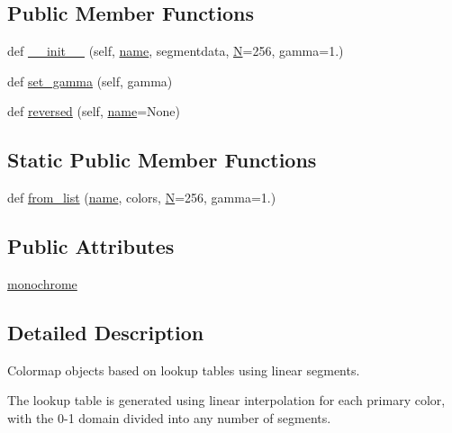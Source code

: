 \subsection*{Public Member Functions}
\begin{DoxyCompactItemize}
\item 
def \hyperlink{classmatplotlib_1_1colors_1_1LinearSegmentedColormap_ac4cce3cbb564402bb71c0dee4d78118a}{\+\_\+\+\_\+init\+\_\+\+\_\+} (self, \hyperlink{classmatplotlib_1_1colors_1_1Colormap_aa816ba9aebc8d8438ca791c82bb6198c}{name}, segmentdata, \hyperlink{classmatplotlib_1_1colors_1_1Colormap_a011f75e2d28856dd18ada18febb2bb26}{N}=256, gamma=1.)
\item 
def \hyperlink{classmatplotlib_1_1colors_1_1LinearSegmentedColormap_a2f198e251d17bf78aa2d64d067bc50eb}{set\+\_\+gamma} (self, gamma)
\item 
def \hyperlink{classmatplotlib_1_1colors_1_1LinearSegmentedColormap_a0bebcf7401f97a02809b57eaf7d30c66}{reversed} (self, \hyperlink{classmatplotlib_1_1colors_1_1Colormap_aa816ba9aebc8d8438ca791c82bb6198c}{name}=None)
\end{DoxyCompactItemize}
\subsection*{Static Public Member Functions}
\begin{DoxyCompactItemize}
\item 
def \hyperlink{classmatplotlib_1_1colors_1_1LinearSegmentedColormap_abfffddd2eee0de3bdbd5f258536da399}{from\+\_\+list} (\hyperlink{classmatplotlib_1_1colors_1_1Colormap_aa816ba9aebc8d8438ca791c82bb6198c}{name}, colors, \hyperlink{classmatplotlib_1_1colors_1_1Colormap_a011f75e2d28856dd18ada18febb2bb26}{N}=256, gamma=1.)
\end{DoxyCompactItemize}
\subsection*{Public Attributes}
\begin{DoxyCompactItemize}
\item 
\hyperlink{classmatplotlib_1_1colors_1_1LinearSegmentedColormap_a048b8576cc8ff2dc1e87b6ac6320eedb}{monochrome}
\end{DoxyCompactItemize}


\subsection{Detailed Description}
\begin{DoxyVerb}Colormap objects based on lookup tables using linear segments.

The lookup table is generated using linear interpolation for each
primary color, with the 0-1 domain divided into any number of
segments.
\end{DoxyVerb}
 

